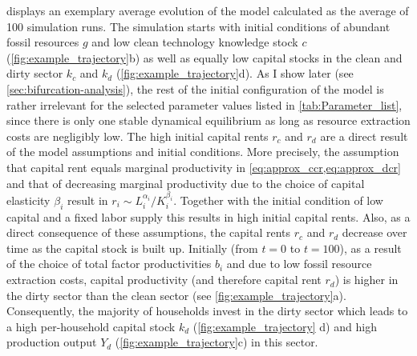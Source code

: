  displays an exemplary average evolution of the model calculated as the average of 100 simulation runs.
The simulation starts with initial conditions of 
abundant fossil resources $g$ and low clean technology knowledge stock $c$ (\cref{fig:example_trajectory}b) as well as equally low capital stocks in the clean and dirty sector $k_c$ and $k_d$ (\cref{fig:example_trajectory}d). As I show later (see \cref{sec:bifurcation-analysis}), the rest of the initial configuration of the model is rather irrelevant for the selected parameter values listed in \cref{tab:Parameter_list}, since there is only one stable dynamical equilibrium as long as resource extraction costs are negligibly low.
The high initial capital rents $r_c$ and $r_d$ are a direct result of the model assumptions and initial conditions. More precisely, the assumption that capital rent equals marginal productivity in 
\cref{eq:approx_ccr,eq:approx_dcr}
and that of decreasing marginal productivity due to the choice of capital elasticity $\beta_i$  result in $r_i \sim L_i^{\alpha_i}/K_i^{\beta_i}$. Together with the initial condition of low capital and a fixed labor supply this results in high initial capital rents. Also, as a direct consequence of these assumptions, the capital rents $r_c$ and $r_d$ decrease over time as the capital stock is built up.
Initially (from $t=0$ to $t=100$), as a result of the choice of total factor productivities $b_i$ and due to low fossil resource extraction costs, capital productivity (and therefore capital rent $r_d$) is higher in the dirty sector than the clean sector (see \cref{fig:example_trajectory}a). 
Consequently, the majority of households invest in the dirty sector which leads to a high per-household capital stock $k_d$ (\cref{fig:example_trajectory} d) and high production output $Y_d$ (\cref{fig:example_trajectory}c) in this sector.

